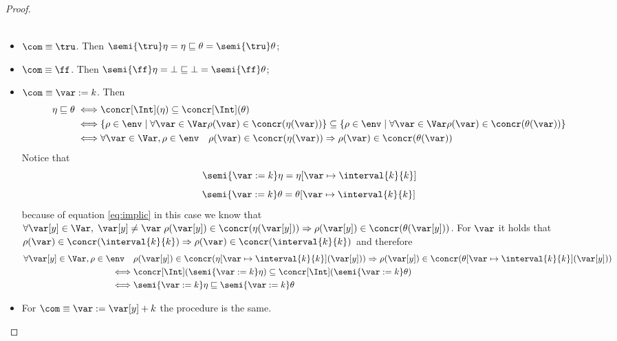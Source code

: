 \begin{proof}
\begin{itemize}
\begin{align*}
    \end{align*}
  \item \(\com \equiv \tru\). Then \(\semi{\tru}\eta = \eta
    \sqsubseteq \theta = \semi{\tru}\theta\);
  \item \(\com \equiv \ff\). Then \(\semi{\ff}\eta = \bot \sqsubseteq
    \bot = \semi{\ff}\theta\);
  \item \(\com \equiv \var := k\). Then
    \begin{align}\label{eq:implic}
      \begin{split}
        \eta \sqsubseteq \theta \iff & \concr[\Int](\eta) \subseteq \concr[\Int](\theta) \\
        \iff & \{\rho\in\env \mid \forall \var \in \Var \rho(\var) \in \concr(\eta(\var))\} \subseteq \{\rho\in\env \mid \forall \var \in \Var \rho(\var) \in \concr(\theta(\var))\} \\
        \iff & \forall \var \in \Var, \rho \in \env \quad \rho(\var) \in \concr(\eta(\var)) \Rightarrow \rho(\var) \in \concr(\theta(\var)) \\
      \end{split}
    \end{align}
    Notice that \[\semi{\var := k}\eta =
    \eta[\var\mapsto\interval{k}{k}]\] \[\semi{\var := k}\theta =
    \theta[\var\mapsto\interval{k}{k}]\] because of equation
    \ref{eq:implic} in this case we know that \(\forall \var[y]\in\Var
    ,\; \var[y] \neq \var \; \rho(\var[y]) \in \concr(\eta(\var[y]))
    \Rightarrow \rho(\var[y]) \in \concr(\theta(\var[y]))\). For
    \(\var\) it holds that \(\rho(\var) \in \concr(\interval{k}{k})
    \Rightarrow \rho(\var) \in \concr(\interval{k}{k})\) and therefore
    \begin{align*}
      \forall \var[y] \in \Var, \rho \in \env \quad & \rho(\var[y]) \in \concr(\eta[\var\mapsto\interval{k}{k}](\var[y])) \Rightarrow \rho(\var[y]) \in \concr(\theta[\var\mapsto\interval{k}{k}](\var[y])) \\
      \iff & \concr[\Int](\semi{\var:=k}\eta) \subseteq \concr[\Int](\semi{\var:=k}\theta) \\
      \iff & \semi{\var :=k}\eta \sqsubseteq \semi{\var := k}\theta
    \end{align*}
  \item For \(\com \equiv \var := \var[y] + k\) the procedure is the
    same.
  \end{itemize}


\end{proof}
